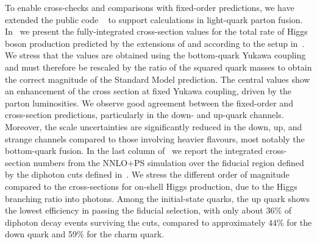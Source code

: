 \documentclass[11pt,a4paper]{article}
\begin{document}
To enable cross-checks and comparisons with fixed-order predictions, we have extended the public code \SuSHi{}~\cite{Harlander:2012pb,Harlander:2003ai} to support calculations in light-quark parton fusion. In~ we present the fully-integrated cross-section values for the total rate of Higgs boson production predicted by the extensions of \SuSHi{} and \minnlo{} according to the setup in~. We stress that the values are obtained using the bottom-quark Yukawa coupling and must therefore be rescaled by the ratio of the squared quark masses to obtain the correct magnitude of the Standard Model prediction. The central values show an enhancement of the cross section at fixed Yukawa coupling, driven by the parton luminosities. We observe good agreement between the fixed-order and \minnlo{} cross-section predictions, particularly in the down- and up-quark channels. Moreover, the scale uncertainties are significantly reduced in the down, up, and strange channels compared to those involving heavier flavours, most notably the bottom-quark fusion. In the last column of~ we report the integrated cross-section numbers from the NNLO+PS simulation over the fiducial region defined by the diphoton cuts defined in~. We stress the different order of magnitude compared to the cross-sections for on-shell Higgs production, due to the Higgs branching ratio into photons. Among the initial-state quarks, the up quark shows the lowest efficiency in passing the fiducial selection, with only about 36\% of diphoton decay events surviving the cuts, compared to approximately 44\% for the down quark and 59\% for the charm quark.
\end{document}
